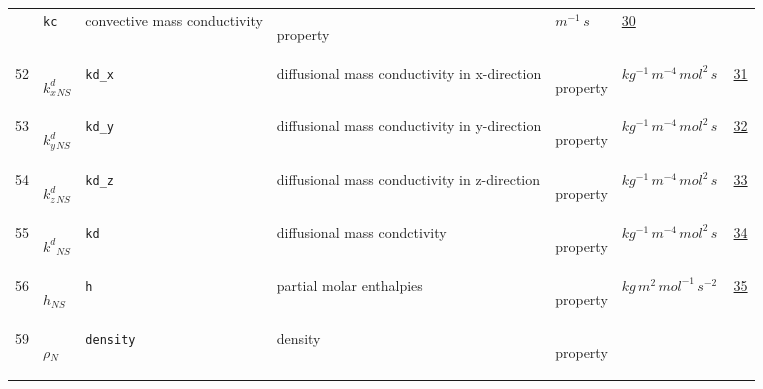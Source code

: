 \begin{longtable}{|p{1cm}|p{2.5cm}|p{4.5cm}|p{8cm}|p{3.0cm}|p{3cm}|p{1cm}|}
             & \verb|kc|
             & convective mass conductivity
             & \begin{lay}property \end{lay}
             & $ m^{-1} \,s \, $
             & \hyperlink{"e:30"}{ 30 }
                 \\
    52
             & \hypertarget{"v:52"}{ $ {{k^d_x}}{_{{N S}}} $}
             & \verb|kd_x|
             & diffusional mass conductivity in x-direction
             & \begin{lay}property \end{lay}
             & $ kg^{-1} \,m^{-4} \,mol^{2} \,s \, $
             & \hyperlink{"e:31"}{ 31 }
                 \\
    53
             & \hypertarget{"v:53"}{ $ {{k^d_y}}{_{{N S}}} $}
             & \verb|kd_y|
             & diffusional mass conductivity in y-direction
             & \begin{lay}property \end{lay}
             & $ kg^{-1} \,m^{-4} \,mol^{2} \,s \, $
             & \hyperlink{"e:32"}{ 32 }
                 \\
    54
             & \hypertarget{"v:54"}{ $ {{k^d_z}}{_{{N S}}} $}
             & \verb|kd_z|
             & diffusional mass conductivity in z-direction
             & \begin{lay}property \end{lay}
             & $ kg^{-1} \,m^{-4} \,mol^{2} \,s \, $
             & \hyperlink{"e:33"}{ 33 }
                 \\
    55
             & \hypertarget{"v:55"}{ $ {{k^d}}{_{{N S}}} $}
             & \verb|kd|
             & diffusional mass condctivity
             & \begin{lay}property \end{lay}
             & $ kg^{-1} \,m^{-4} \,mol^{2} \,s \, $
             & \hyperlink{"e:34"}{ 34 }
                 \\
    56
             & \hypertarget{"v:56"}{ $ {h}{_{{N S}}} $}
             & \verb|h|
             & partial molar enthalpies
             & \begin{lay}property \end{lay}
             & $ kg \,m^{2} \,mol^{-1} \,s^{-2} \, $
             & \hyperlink{"e:35"}{ 35 }
                 \\
    59
             & \hypertarget{"v:59"}{ $ {\rho}{_{N}} $}
             & \verb|density|
             & density
             & \begin{lay}property \end{lay}

\end{longtable}
